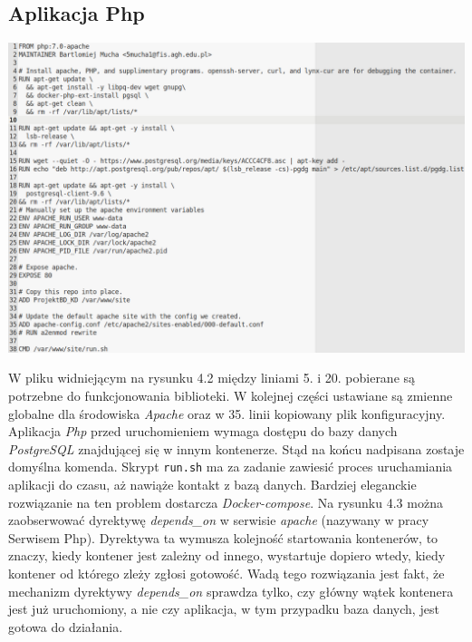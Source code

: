 \documentclass[polish, a4paper, 12pt, oneside]{book}
\begin{document}
	\subsection{Aplikacja Php}
	\begin{center}
		\includegraphics[width=160mm]{dockerfile_php.png}
	\end{center}
	W pliku widniejącym na rysunku 4.2 między liniami 5. i 20. pobierane są potrzebne do funkcjonowania biblioteki. W kolejnej części ustawiane są zmienne globalne dla środowiska \textit{Apache}\cite{apache} oraz w 35. linii kopiowany plik konfiguracyjny. Aplikacja \textit{Php} przed uruchomieniem wymaga dostępu do bazy danych \textit{PostgreSQL}\cite{postgresql} znajdującej się w innym kontenerze. Stąd na końcu nadpisana zostaje domyślna komenda. Skrypt \texttt{run.sh} ma za zadanie zawiesić proces uruchamiania aplikacji do czasu, aż nawiąże kontakt z bazą danych. Bardziej eleganckie rozwiązanie na ten problem dostarcza \textit{Docker-compose}\cite{dockercompose}. Na rysunku 4.3 można zaobserwować dyrektywę \textit{depends\_on} w serwisie \textit{apache} (nazywany w pracy Serwisem Php). Dyrektywa ta wymusza kolejność startowania kontenerów, to znaczy, kiedy kontener jest zależny od innego, wystartuje dopiero wtedy, kiedy kontener od którego zleży zgłosi gotowość. Wadą tego rozwiązania jest fakt, że mechanizm dyrektywy \textit{depends\_on} sprawdza tylko, czy główny wątek kontenera jest już uruchomiony, a nie czy aplikacja, w tym przypadku baza danych, jest gotowa do działania.
	
\end{document}
